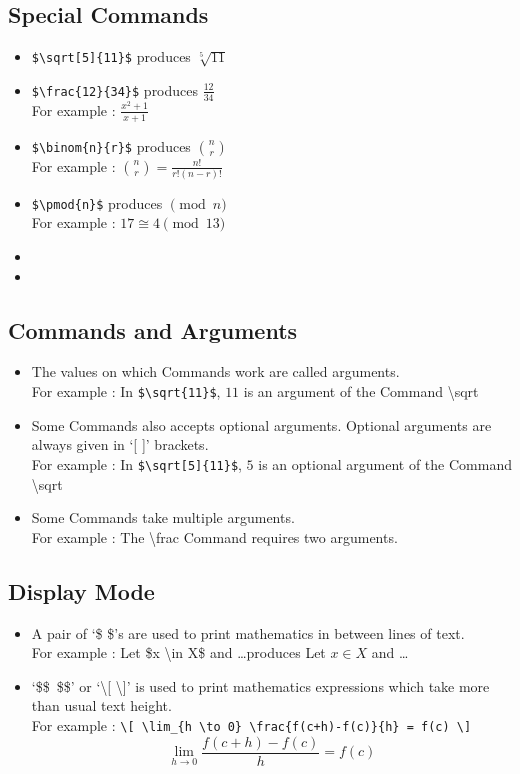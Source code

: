 \documentclass{article}
\begin{document}
\subsection{Special Commands}
\begin{itemize}
	\item \texttt{\$\textbackslash{}sqrt[5]\{11\}\$} produces $\sqrt[5]{11}$
	\item \texttt{\$\textbackslash{}frac\{12\}\{34\}\$} produces $\frac{12}{34}$ \\ For example : $\frac{x^2+1}{x+1}$
	\item \texttt{\$\textbackslash{}binom\{n\}\{r\}\$} produces $\binom{n}{r}$ \\ For example : $\binom{n}{r} = \frac{n!}{r!(n-r)!}$
	\item \texttt{\$\textbackslash{}pmod\{n\}\$} produces $\pmod{n}$ \\ For example : $17 \cong 4 \pmod{13}$
	\item %
	\item %
\end{itemize}

\subsection{Commands and Arguments}
\begin{itemize}
	\item The values on which Commands work are called arguments. \\ For example : In \texttt{\$\textbackslash{}sqrt\{11\}\$}, $11$ is an argument of the Command \textbackslash{}sqrt
	\item Some Commands also accepts optional arguments. Optional arguments are always given in `[ ]' brackets. \\ For example : In \texttt{\$\textbackslash{}sqrt[5]\{11\}\$}, $5$ is an optional argument of the Command \textbackslash{}sqrt
	\item Some Commands take multiple arguments. \\ For example : The \textbackslash{}frac Command requires two arguments.
\end{itemize}

\subsection{Display Mode}
\begin{itemize}
	\item A pair of `\$ \$'s are used to print mathematics in between lines of text.\\ For example : Let \$x \textbackslash{}in X\$ and \dots produces Let $x \in X$ and \dots
	\item `\$\$\ \$\$' or `\textbackslash{}[ \textbackslash{}]' is used to print mathematics expressions which take more than usual text height.\\ For example : \texttt{\textbackslash{}[ \textbackslash{}lim\_\{h \textbackslash{}to 0\} \textbackslash{}frac\{f(c+h)-f(c)\}\{h\} = f(c) \textbackslash{}]} \[ \lim_{h \to 0} \frac{f(c+h)-f(c)}{h} = f(c) \] 
\end{itemize}
\end{document}
